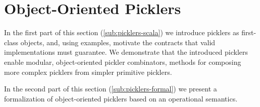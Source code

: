 


\section{Object-Oriented Picklers}\label{sec:oopicklers}

In the first part of this section (\ref{sub:picklers-scala}) we introduce
picklers as first-class objects, and, using examples, motivate the contracts
that valid implementations must guarantee. We demonstrate that the introduced
picklers enable modular, object-oriented pickler combinators, \ie methods for
composing more complex picklers from simpler primitive picklers.

In the second part of this section (\ref{sub:picklers-formal}) we present a
formalization of object-oriented picklers based on an operational semantics.

